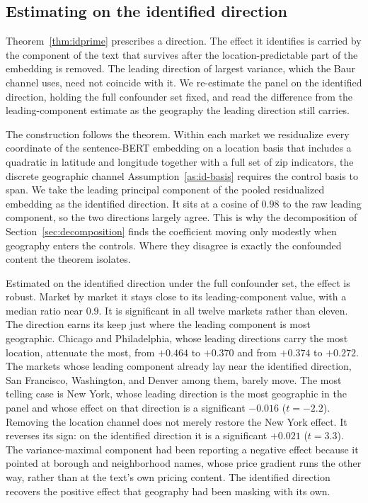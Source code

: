 \subsection{Estimating on the identified direction}
\label{sec:identified-direction}

Theorem~\ref{thm:idprime} prescribes a direction. The effect it identifies is
carried by the component of the text that survives after the location-predictable
part of the embedding is removed. The leading direction of largest variance,
which the Baur channel uses, need not coincide with it. We re-estimate the panel on
the identified direction, holding the full confounder set fixed, and read the
difference from the leading-component estimate as the geography the leading
direction still carries.

The construction follows the theorem. Within each market we residualize every
coordinate of the sentence-BERT embedding on a location basis that includes a
quadratic in latitude and longitude together with a full set of zip indicators, the
discrete geographic channel Assumption~\ref{as:id-basis} requires the control basis
to span. We take the leading principal component of the pooled residualized
embedding as the identified direction. It sits at a cosine of $0.98$ to the raw
leading component, so the two directions largely agree. This is why the
decomposition of Section~\ref{sec:decomposition} finds the coefficient moving only
modestly when geography enters the controls. Where they disagree is exactly the
confounded content the theorem isolates.

Estimated on the identified direction under the full confounder set, the effect is
robust. Market by market it stays close to its leading-component value, with a
median ratio near $0.9$. It is significant in all twelve markets rather than
eleven. The direction earns its keep just where the leading component is most
geographic. Chicago and Philadelphia, whose leading directions carry the most
location, attenuate the most, from $+0.464$ to $+0.370$ and from $+0.374$ to
$+0.272$. The markets whose leading component already lay near the identified
direction, San Francisco, Washington, and Denver among them, barely move. The most
telling case is New York, whose leading direction is the most geographic in the
panel and whose effect on that direction is a significant $-0.016$ ($t=-2.2$).
Removing the location channel does not merely restore the New York effect. It
reverses its sign: on the identified direction it is a significant $+0.021$
($t=3.3$). The variance-maximal component had been reporting a negative effect
because it pointed at borough and neighborhood names, whose price gradient runs the
other way, rather than at the text's own pricing content. The identified
direction recovers the positive effect that geography had been masking with its own.

